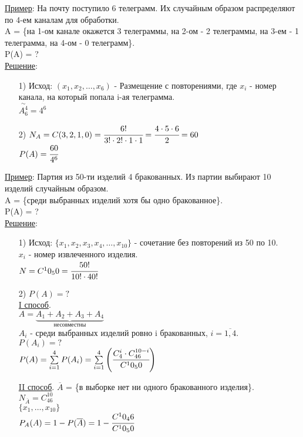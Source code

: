 \underline{Пример}: На почту поступило 6 телеграмм. Их случайным образом распределяют по 4-ем каналам для обработки. \\
A = \{на 1-ом канале окажется 3 телеграммы, на 2-ом - 2 телеграммы, на 3-ем - 1 телеграмма, на 4-ом - 0 телеграмм\}. \\
P(A) = ? \\
\underline{Решение}: 
\begin{enumerate}
\item[1)] 
Исход: $(x_1, x_2, \ldots, x_6)$ - Размещение с повторениями, где $x_i$ - номер канала, на который попала i-ая телеграмма. \\
$\stackrel{\sim}{A^4_6} = 4^6$ \\

\item[2)]
$N_A = C(3,2,1,0) = \cfrac{6!}{3! \cdot 2! \cdot 1 \cdot 1} = \cfrac{4 \cdot 5 \cdot 6}{2} = 60$ \\
$P(A) = \cfrac{60}{4^6}$ \\
\end{enumerate}

\underline{Пример}: Партия из 50-ти изделий 4 бракованных. Из партии выбирают 10 изделий случайным образом. \\
A = \{среди выбранных изделий хотя бы одно бракованное\}. \\
P(A) = ? \\
\underline{Решение}: 
\begin{enumerate}
\item[1)]
Исход: $\{x_1, x_2, x_3, x_4, \ldots, x_10\}$ - сочетание без повторений из 50 по 10. \\
$x_i$ - номер извлеченного изделия. \\
$N = C^10_50 = \cfrac{50!}{10! \cdot 40!}$ \\

\item[2)] $P(A) = ?$ \\
\underline{I способ}. \\
$A = \underbrace{A_1 + A_2 + A_3 + A_4}_{\text{несовместны}}$ \\
$A_i$ - среди выбранных изделий ровно i бракованных, $i = \overline{1,4}$. \\
$P(A_i) = ?$ \\
$P(A) = \sum\limits_{i = 1}^{4} P(A_i) = \sum\limits_{i = 1}^{4} \left( \cfrac{C^i_4 \cdot C^{10 - i}_{46}}{C^10_50} \right)$ 

\underline{II способ}. 
$\overline{A}$ = \{в выборке нет ни одного бракованного изделия\}. \\
$N_{\overline{A}} = C^10_46$ \\
$\{x_1, \ldots, x_10\}$ \\
$P_A(A) = 1 - P(\overline{A}) = 1 - \cfrac{C^10_46}{C^10_50}$ \\
\end{enumerate}


